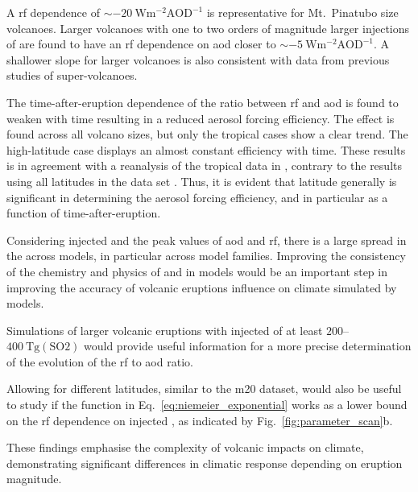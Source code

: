\documentclass{ametsocV6.1}
\newcommand{\iso}[1][i]{{#1}njected \ce{SO2}}
\begin{document}
A \gls{rf}
dependence of \(\sim\SI{-20}{\watt\metre^{-2}\mathrm{AOD}^{-1}}\) is representative for
Mt.\ Pinatubo size volcanoes. Larger volcanoes with one to two orders of magnitude
larger injections of  are found to have an \gls{rf} dependence on \gls{aod}
closer to \(\sim \SI{-5}{\watt\metre^{-2}\mathrm{AOD}^{-1}}\). A shallower slope for
larger volcanoes is also consistent with data from previous studies of super-volcanoes.

The time-after-eruption dependence of the ratio between \gls{rf} and \gls{aod} is found
to weaken with time resulting in a reduced aerosol forcing efficiency. The effect is
found across all volcano sizes, but only the tropical cases show a clear trend. The
high-latitude case displays an almost constant efficiency with time. These results is in agreement with a reanalysis of the tropical data in \citet{marshall2020dataset}, contrary to the results using all latitudes in the data set \citet{marshall2020}.
Thus, it is evident that latitude generally is significant in determining the aerosol forcing
efficiency, and in particular as a function of time-after-eruption.

Considering \iso{} and the peak values of \gls{aod} and \gls{rf}, there is a large spread in the across models, in particular across model families. Improving the consistency of the
chemistry and physics of  and  in models would be an important step in
improving the accuracy of volcanic eruptions influence on climate simulated by models.

Simulations of larger volcanic eruptions with \iso{} of at least
\(200\)--\(\SI{400}{\tera\gram(\mathrm{SO2})}\) would provide useful information for a
more precise determination of the evolution of the \gls{rf} to \gls{aod} ratio.

Allowing for different latitudes, similar to the \gls{m20} dataset, would also be useful to study
if the function in Eq.~\ref{eq:niemeier_exponential} works as a lower bound on the
\gls{rf} dependence on \iso{}, as indicated by Fig.~\ref{fig:parameter_scan}b.

These findings
emphasise the complexity of volcanic impacts on climate, demonstrating significant
differences in climatic response depending on eruption magnitude.
\end{document}
